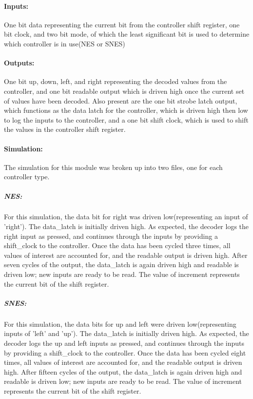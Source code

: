 \documentclass[]{article}
\begin{document}
\paragraph{Inputs:} One bit data representing the current bit from the controller shift register, one bit clock, and two bit mode, of which the least significant bit is used to determine which controller is in use(NES or SNES)
\paragraph{Outputs:} One bit up, down, left, and right representing the decoded values from the controller, and one bit readable output which is driven high once the current set of values have been decoded. Also present are the one bit strobe latch output, which functions as the data latch for the controller, which is driven high then low to log the inputs to the controller, and a one bit shift clock, which is used to shift the values in the controller shift register.
\paragraph{Simulation:} The simulation for this module was broken up into two files, one for each controller type.
\subparagraph{NES:} For this simulation, the data bit for right was driven low(representing an input of 'right'). The data\_latch is initially driven high.
As expected, the decoder logs the right input as pressed, and continues through the inputs by providing a shift\_clock to the controller.
Once the data has been cycled three times, all values of interest are accounted for, and the readable output is driven high.
After seven cycles of the output, the data\_latch is again driven high and readable is driven low; new inputs are ready to be read.
The value of increment represents the current bit of the shift register.
\subparagraph{SNES:} For this simulation, the data bits for up and left were driven low(representing inputs of 'left' and 'up').
The data\_latch is initially driven high. As expected, the decoder logs the up and left inputs as pressed,
and continues through the inputs by providing a shift\_clock to the controller.
Once the data has been cycled eight times, all values of interest are accounted for, and the readable output is driven high.
After fifteen cycles of the output, the data\_latch is again driven high and readable is driven low; new inputs are ready to be read.
The value of increment represents the current bit of the shift register.
\end{document}
